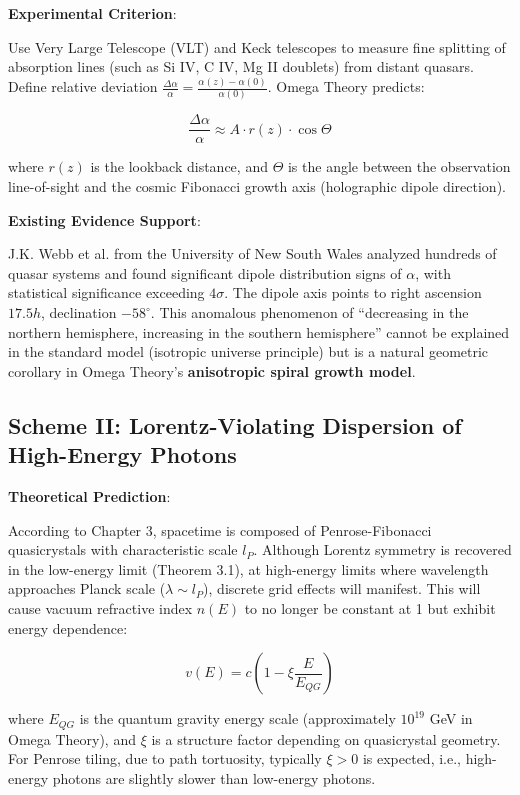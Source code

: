 \textbf{Experimental Criterion}:

Use Very Large Telescope (VLT) and Keck telescopes to measure fine splitting of absorption lines (such as Si IV, C IV, Mg II doublets) from distant quasars.
Define relative deviation $\frac{\Delta \alpha}{\alpha} = \frac{\alpha(z) - \alpha(0)}{\alpha(0)}$.
Omega Theory predicts:

\[\frac{\Delta \alpha}{\alpha} \approx A \cdot r(z) \cdot \cos \Theta\]

where $r(z)$ is the lookback distance, and $\Theta$ is the angle between the observation line-of-sight and the cosmic Fibonacci growth axis (holographic dipole direction).

\textbf{Existing Evidence Support}:

J.K. Webb et al. from the University of New South Wales analyzed hundreds of quasar systems and found significant dipole distribution signs of $\alpha$, with statistical significance exceeding $4\sigma$. The dipole axis points to right ascension $17.5h$, declination $-58^\circ$. This anomalous phenomenon of ``decreasing in the northern hemisphere, increasing in the southern hemisphere'' cannot be explained in the standard model (isotropic universe principle) but is a natural geometric corollary in Omega Theory's \textbf{anisotropic spiral growth model}.

\subsection{Scheme II: Lorentz-Violating Dispersion of High-Energy Photons}

\textbf{Theoretical Prediction}:

According to Chapter 3, spacetime is composed of Penrose-Fibonacci quasicrystals with characteristic scale $l_P$. Although Lorentz symmetry is recovered in the low-energy limit (Theorem 3.1), at high-energy limits where wavelength approaches Planck scale ($\lambda \sim l_P$), discrete grid effects will manifest.
This will cause vacuum refractive index $n(E)$ to no longer be constant at 1 but exhibit energy dependence:

\[v(E) = c \left( 1 - \xi \frac{E}{E_{QG}} \right)\]

where $E_{QG}$ is the quantum gravity energy scale (approximately $10^{19}$ GeV in Omega Theory), and $\xi$ is a structure factor depending on quasicrystal geometry. For Penrose tiling, due to path tortuosity, typically $\xi > 0$ is expected, i.e., high-energy photons are slightly slower than low-energy photons.

